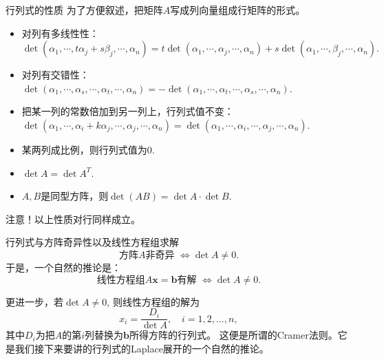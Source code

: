 \begin{frame}

\begin{block}{行列式的性质}
为了方便叙述，把矩阵$A$写成列向量组成行矩阵的形式。
\begin{itemize}
\item 对列有多线性性：$\det(\alpha_1, \cdots, t\alpha_j + s\beta_j, \cdots, \alpha_n) = t\det(\alpha_1, \cdots, \alpha_j, \cdots, \alpha_n) + s\det(\alpha_1, \cdots, \beta_j, \cdots, \alpha_n).$
\item 对列有交错性：$\det(\alpha_1, \cdots, \alpha_s, \cdots, \alpha_t, \cdots, \alpha_n) = -\det(\alpha_1, \cdots, \alpha_t, \cdots, \alpha_s, \cdots, \alpha_n).$
\item 把某一列的常数倍加到另一列上，行列式值不变：$\det(\alpha_1, \cdots, \alpha_i + k\alpha_j, \cdots, \alpha_j, \cdots, \alpha_n) = \det(\alpha_1, \cdots, \alpha_i, \cdots, \alpha_j, \cdots, \alpha_n).$
\item 某两列成比例，则行列式值为0.
\item $\det A = \det A^T$.
\item $A,B$是同型方阵，则$\det(AB) = \det A \cdot \det B$.
\end{itemize}
\end{block}

{\color{red}注意！}以上性质对行同样成立。

\end{frame}


\begin{frame}

\begin{block}{行列式与方阵奇异性以及线性方程组求解}
\[\text{方阵$A$非奇异 } \Longleftrightarrow \det A \neq 0.\]
于是，一个自然的推论是：
\[\text{线性方程组$A\mathbf{x} = \mathbf{b}$有解 } \Longleftrightarrow \det A \neq 0.\]

\pause

更进一步，若$\det A \neq 0$, 则线性方程组的解为
\[x_i = \dfrac{D_i}{\det A}, \quad i = 1,2,\ldots,n,\]
其中$D_i$为把$A$的第$i$列替换为$\mathbf{b}$所得方阵的行列式。\newline
这便是所谓的Cramer法则。它是我们接下来要讲的行列式的Laplace展开的一个自然的推论。
\end{block}

\end{frame}


